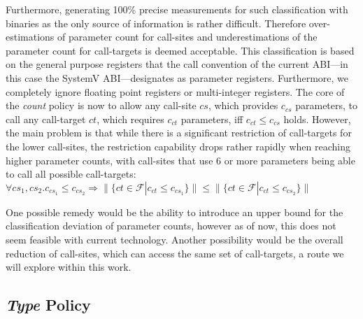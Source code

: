  Furthermore, generating 100\% precise measurements for such classification with binaries as the only source of information is rather difficult. 
 Therefore over-estimations of parameter count for call-sites and underestimations of the parameter count for call-targets is deemed acceptable. 
 This classification is based on the general purpose registers that the call convention of the current ABI---in this case the 
 SystemV ABI---designates as parameter registers. Furthermore, we completely ignore floating point registers or multi-integer registers. 
 The core of the \emph{count} policy is now to allow any call-site $cs$, which provides $c_{cs}$ parameters, to call any call-target $ct$, 
 which requires $c_{ct}$ parameters, iff $c_{ct} \leq c_{cs}$ holds. However, the main problem is that while there is a significant 
 restriction of call-targets for the lower call-sites, the restriction capability drops rather rapidly when reaching higher parameter 
 counts, with call-sites that use 6 or more parameters being able to call all possible call-targets:
$
	\forall cs_1, cs_2.  c_{cs_1} \leq c_{cs_2} \Longrightarrow  \| \{ct \in \mathcal{F} | c_{ct} \leq c_{cs_1} \} \| \leq \| \{ct \in \mathcal{F} | c_{ct} \leq c_{cs_2}  \} \|
$

One possible remedy would be the ability to introduce an upper bound for the classification deviation of parameter counts, 
however as of now, this does not seem feasible with current technology. Another possibility would be the overall reduction
of call-sites, which can access the same set of call-targets, a route we will explore within this work.

\subsection{\emph{Type} Policy}
\label{section:typepolicy}

